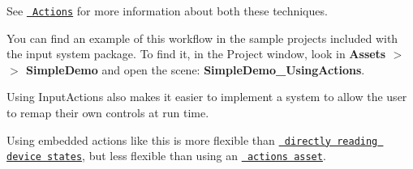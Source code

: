 See \href{Actions.html}{\texttt{ Actions}} for more information about both these techniques.

You can find an example of this workflow in the sample projects included with the input system package. To find it, in the Project window, look in {\bfseries{Assets \texorpdfstring{$>$}{>}  \texorpdfstring{$>$}{>} Simple\+Demo}} and open the scene\+: {\bfseries{Simple\+Demo\+\_\+\+Using\+Actions}}.

Using Input\+Actions also makes it easier to implement a system to allow the user to remap their own controls at run time.

Using embedded actions like this is more flexible than \href{Workflow-Direct.html}{\texttt{ directly reading device states}}, but less flexible than using an \href{Workflow-ActionsAsset.html}{\texttt{ actions asset}}. 
